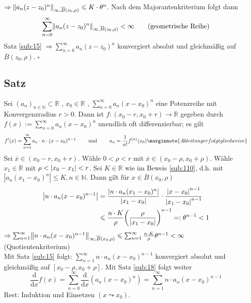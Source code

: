 $\Rightarrow \norm[\infty, \overline{B}(z_0, \rho) ]{a_n (z-z_0)^n}  \le K \cdot \theta^n$. Nach dem Majorantenkriterium folgt dann
\[
	\sum_{n=0}^{\infty} \norm[\infty, \overline{B} (z_0, \rho)]{a_n (z-z_0)^n} < \infty \tag{geometrische Reihe}
\]
Satz \ref{sub:15} $\Rightarrow \sum_{n=0}^{\infty} a_n (z-z_0)^n$ konvergiert absolut und gleichmäßig auf $\overline{B}(z_0, \rho) $. \hfill \( \square \)

\subsection[Satz über Differenzierbarkeit innerhalb des Konvergenzradius]{Satz} %
\label{sub:111}
Sei $(a_n)_{n \in \mathds{N}} \subset \mathds{R}$ , $x_0 \in \mathds{R}$ , $\sum_{n=0}^{\infty} a_n (x-x_0)^n$ eine Potenzreihe mit Konvergenzradius $r>0$.
Dann ist $f : (x_0 -r , x_0 +r) \to \mathds{R}$ gegeben durch $f(x) := \sum_{n=0}^{\infty} a_n (x-x_0)^n$ unendlich oft differenzierbar; es gilt
\[
	f'(x) = \sum_{n=1}^{\infty} a_n \cdot n \cdot (x-x_0)^{n-1} \qquad \text{ und } \qquad a_n = \frac{1}{n!} f^{(n)}(x_0)
	\marginnote{Ableitung erfolgt gliedweise}
\]
Sei $\overline{x}\in (x_0 -r, x_0 +r) $. Wähle $0<\rho < r$ mit $\overline{x} \in ( x_0 - \rho, x_0 + \rho)$. Wähle $x_1\in \mathds{R}$ mit $\rho < \abs*{x_0 - x_1} <r $.
Sei $K \in \mathds{R}$ wie im Beweis \ref{sub:110}, d.h. mit $| a_n(x_1 -x_0)^n | \le K , n \in \mathds{N} $. Dann gilt für $x \in \overline{B}(x_0, \rho) $
\begin{align*}
	\abs*{n \cdot a_n (x-x_0)^{n-1}} &= \frac{\abs*{n \cdot  a_n (x_1-x_0)^n}}{\abs*{x_1-x_0} } \cdot \frac{\abs*{x-x_0}^{n-1} }{\abs*{x_1-x_0}^{n-1} } \\  
	&\le \frac{n \cdot K}{\rho} \enbrace*{\frac{\rho}{\abs*{x_1-x_0} } }^{n-1} =: \theta^{n-1} <1  
\end{align*}
$\Rightarrow \sum_{n=1}^{\infty} \norm[\infty, \overline{B} (x_0, \rho)]{n \cdot a_n (x-x_0)^{n-1}}\le \sum_{n=1}^{\infty} \frac{n \cdot K}{\rho} \theta^{n-1} <\infty $
 (Quotientenkriterium)\\
Mit Satz \ref{sub:15} folgt: $\sum_{n=1}^{\infty} n \cdot a_n (x-x_0)^{n-1} $ konvergiert absolut und gleichmäßig auf $[x_0- \rho, x_0+\rho]$. Mit Satz \ref{sub:18} folgt 
weiter
\[
	\frac{\mathrm{d}}{ \mathrm{d}x } f(x) = \sum_{n=0}^{\infty}  \frac{\mathrm{d}}{ \mathrm{d}x } (a_n (x-x_0)^n) = \sum_{n=1}^{\infty} n \cdot a_n (x-x_0)^{n-1}
\]
Rest: Induktion und Einsetzen $(x \leadsto x_0)$. \bewende

